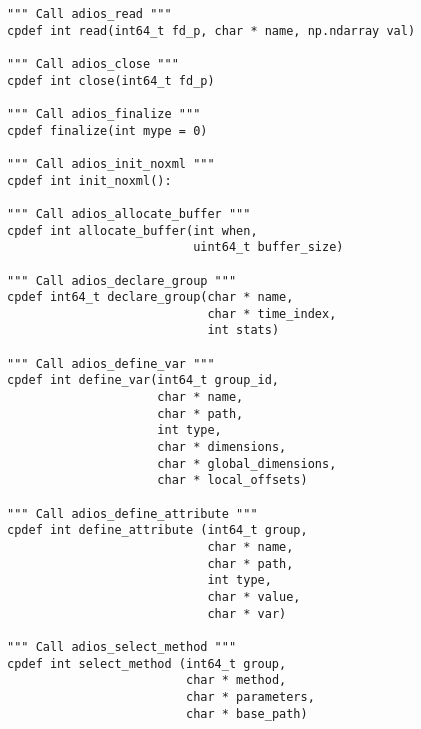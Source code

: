 \begin{lstlisting}[language=cython,caption={Functions for writing and No-XML},label={},]
""" Call adios_read """
cpdef int read(int64_t fd_p, char * name, np.ndarray val)

""" Call adios_close """
cpdef int close(int64_t fd_p)

""" Call adios_finalize """
cpdef finalize(int mype = 0)

""" Call adios_init_noxml """
cpdef int init_noxml():

""" Call adios_allocate_buffer """
cpdef int allocate_buffer(int when,
                          uint64_t buffer_size)

""" Call adios_declare_group """
cpdef int64_t declare_group(char * name,
                            char * time_index,
                            int stats)

""" Call adios_define_var """
cpdef int define_var(int64_t group_id,
                     char * name,
                     char * path,
                     int type,
                     char * dimensions,
                     char * global_dimensions,
                     char * local_offsets)

""" Call adios_define_attribute """
cpdef int define_attribute (int64_t group,
                            char * name,
                            char * path,
                            int type,
                            char * value,
                            char * var)

""" Call adios_select_method """
cpdef int select_method (int64_t group,
                         char * method,
                         char * parameters,
                         char * base_path)
\end{lstlisting}

